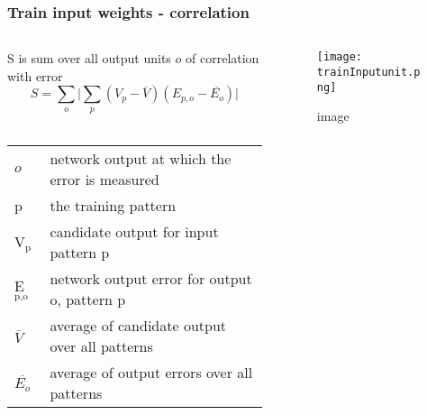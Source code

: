 \documentclass[presentation]{beamer}
\begin{document}
\begin{frame}
  \frametitle{Train input weights - correlation}
	\begin{columns}[t]
		\begin{column}[t]{0.5\textwidth}
      \small{S is sum over all output units $\mathit{o}$ of correlation with error}
      $$ S = \sum_{o} \lvert \sum_{p} (V_{p} - \overline{V}) (E_{p,o} - \overline{E_{o}}) \rvert $$
     \\  
      \begin{center}
        \begin{tabular}{ll}
          \(\mathit{o}\) & \tiny{network output at which the error is measured} \\
          p & \tiny{the training pattern} \\
          V\(_{\text{p}}\) & \tiny{candidate output for input pattern p}   \\
          E\(_{\text{p,o}}\) & \tiny{network output error for output o, pattern p} \\
          \(\overline{V}\) & \tiny{average of candidate output over all patterns} \\
          \(\overline{E_{o}}\) & \tiny{average of output errors over all patterns} \\
        \end{tabular}
      \end{center}
		\end{column}
		\begin{column}{0.5\textwidth}
      \begin{figure}
        \centering
        \texttt{[image: trainInputunit.png]}
        \caption{image}
      \end{figure}			
		\end{column}
	\end{columns}
\end{frame}
\end{document}
